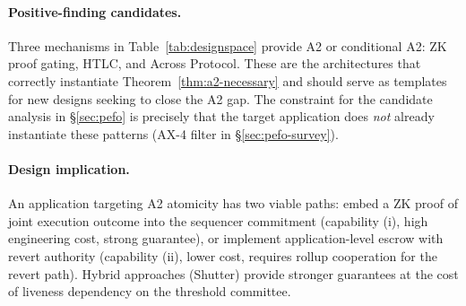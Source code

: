 \paragraph{Positive-finding candidates.}
Three mechanisms in Table~\ref{tab:designspace} provide A2 or conditional A2:
ZK proof gating, HTLC, and Across Protocol. These are the architectures that
correctly instantiate Theorem~\ref{thm:a2-necessary} and should serve as
templates for new designs seeking to close the A2 gap. The constraint for the
candidate analysis in \S\ref{sec:pefo} is precisely that the target application
does \emph{not} already instantiate these patterns (AX-4 filter in
\S\ref{sec:pefo-survey}).

\paragraph{Design implication.}
An application targeting A2 atomicity has two viable paths: embed a ZK proof
of joint execution outcome into the sequencer commitment (capability (i), high
engineering cost, strong guarantee), or implement application-level escrow
with revert authority (capability (ii), lower cost, requires rollup cooperation
for the revert path). Hybrid approaches (Shutter) provide stronger guarantees
at the cost of liveness dependency on the threshold committee.
